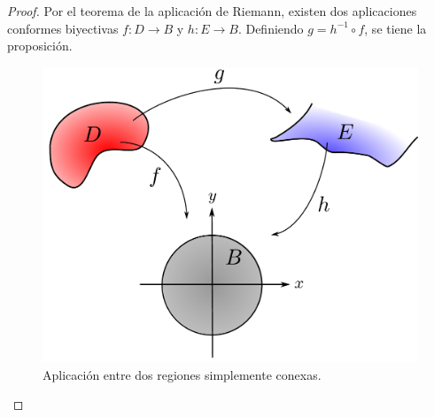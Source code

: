 \begin{proof}
Por el teorema de la aplicación de Riemann, existen dos aplicaciones conformes biyectivas $f: D \rightarrow B$ y $h: E \rightarrow B$. Definiendo $g = h^{-1} \circ f$, se tiene la proposición.

\begin{figure}[H]
    \centering
    \includegraphics[scale = 0.5]{Figuras/MapeoConforme3.pdf}
    \caption{Aplicación entre dos regiones simplemente conexas.}
    \label{fig:Conforme3}
\end{figure}
\end{proof}

